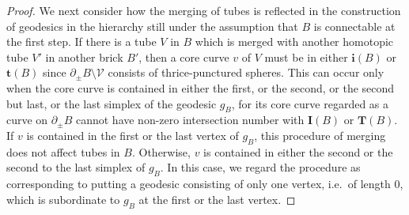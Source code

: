 \documentclass{amsart}
\theoremstyle{definition}
\numberwithin{figure}{section}
\numberwithin{equation}{section}
\newcommand{\ie}{i.e.\ }
\def\v{\mathrm{v}}
\def\cv{\mathcal{V}}
\begin{document}
\begin{proof}


We next consider how  the merging of tubes is reflected in the construction of geodesics in the hierarchy still under the assumption that $B$ is connectable at the first step.
If there is a tube $V$ in $B$ which is merged with another homotopic tube $V'$ in another brick $B'$, then a core curve $v$ of $V$ must be in either $\boldsymbol{i}(B)$ or $\boldsymbol{t}(B)$ since $\partial_\pm B \setminus \cv$ consists of thrice-punctured spheres.
This can occur only when the core curve is contained in either the first, or the second, or the second but last, or the last simplex of the geodesic $g_B$, for its core curve regarded as a curve on $\partial_\pm B$ cannot have non-zero intersection number with $\mathbf I(B)$ or $\mathbf T(B)$.
If $v$ is contained in the first or the last vertex of $g_B$, this procedure of merging does not affect tubes in $B$.
Otherwise, $v$ is  contained in either the second or the second to the last simplex of $g_B$.
In this case, we regard the procedure as corresponding to putting a geodesic consisting of only one vertex, \ie of length $0$, which is subordinate to $g_B$ at the first or the last vertex.



\end{proof}
\end{document}
